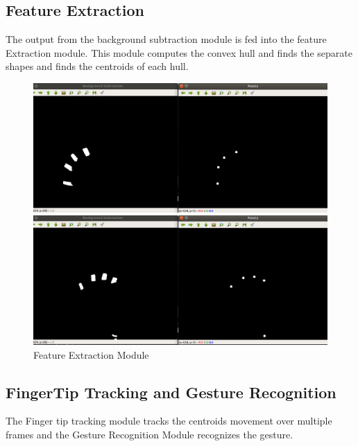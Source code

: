 \documentclass[11pt]{report}
\begin{document}
\subsection{Feature Extraction}

The output from the background subtraction module is fed into the feature Extraction
module. This module computes the convex hull and finds the separate shapes and finds the centroids of 
each hull.

\begin{figure}[h]
    \includegraphics[width=15cm]{featuretest.png}
    
    \includegraphics[width=15cm]{featuretest2.png}
    \caption{Feature Extraction Module}
\end{figure}

\subsection{FingerTip Tracking and Gesture Recognition}

The Finger tip tracking module tracks the centroids movement over multiple frames and the Gesture Recognition Module recognizes the gesture.
\end{document}
